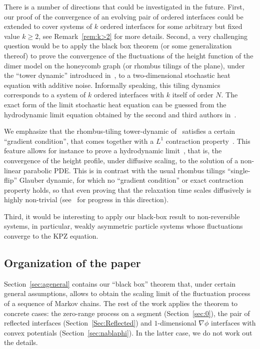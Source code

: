 \documentclass[10pt]{amsart}
\theoremstyle{definition}\newtheorem{defi}[theo]{Definition}\newtheorem{rema}[theo]{Remark}\newtheorem{exam}[theo]{Example}\newtheorem{exem}[theo]{Example}\newtheorem{nota}[theo]{Notation}
\theoremstyle{plain}
\begin{document}
There is a number of directions that could be investigated in the future. First, our proof of the convergence of an evolving pair of ordered interfaces could be extended to cover systems of $k$ ordered interfaces for some arbitrary but fixed value $k\ge 2$, see Remark~\ref{rem:k>2} for more details. Second, a very challenging question would be to apply the black box theorem (or some generalization thereof) to prove the convergence of the fluctuations of the height function of the dimer model on the honeycomb graph (or rhombus tilings of the plane), under the ``tower dynamic'' introduced in~\cite{luby2001markov,wilson2004mixing}, to a two-dimensional stochastic heat equation with additive noise. Informally speaking, this tiling dynamics corresponds to a system of $k$ ordered interfaces with $k$ itself of order $N$. The exact form of the limit stochastic heat equation can be guessed from the hydrodynamic limit equation obtained by the second and third authors in~\cite{LT1,LT2}.

We emphasize that the rhombus-tiling tower-dynamic of~\cite{wilson2004mixing} satisfies a certain ``gradient condition'', that comes together with a $L^1$ contraction property~\cite[Section~3]{LT1}. This feature allows for instance to prove a hydrodynamic limit~\cite{LT1,LT2}, that is, the convergence of the height profile, under diffusive scaling, to the solution of a non-linear parabolic PDE. This is in contrast with the usual rhombus tilings ``single-flip'' Glauber dynamic, for which no ``gradient condition'' or exact contraction property holds, so that even proving that the relaxation time scales diffusively is highly non-trivial (see~\cite{CMTcmp,LTahp} for progress in this direction).

Third, it would be interesting to apply our black-box result to non-reversible systems, in particular, weakly asymmetric particle systems whose fluctuations converge to the KPZ equation.



\subsection*{Organization of the paper}

Section~\ref{sec:ageneral} contains our ``black box'' theorem that, under certain general assumptions, allows to obtain the scaling limit of the fluctuation process of a sequence of Markov chains. The rest of the work applies the theorem to concrete cases: the zero-range process on a segment (Section~\ref{sec:0}), the pair of reflected interfaces (Section~\ref{Sec:Reflected}) and $1$-dimensional $\nabla\phi$ interfaces with convex potentials (Section~\ref{sec:nablaphi}). In the latter case, we do not work out the details.
\end{document}
